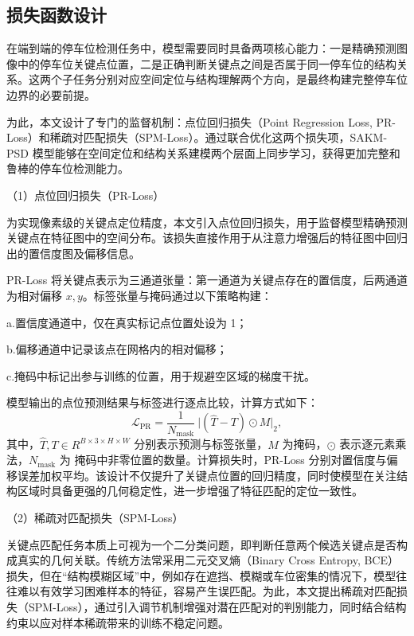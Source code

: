 \subsection{损失函数设计}
在端到端的停车位检测任务中，模型需要同时具备两项核心能力：一是精确预测图像中的停车位关键点位置，二是正确判断关键点之间是否属于同一停车位的结构关系。这两个子任务分别对应空间定位与结构理解两个方向，是最终构建完整停车位边界的必要前提。

为此，本文设计了专门的监督机制：点位回归损失（Point Regression Loss, PR-Loss）和稀疏对匹配损失（SPM-Loss）。通过联合优化这两个损失项，SAKM-PSD 模型能够在空间定位和结构关系建模两个层面上同步学习，获得更加完整和鲁棒的停车位检测能力。

（1）点位回归损失（PR-Loss）

为实现像素级的关键点定位精度，本文引入点位回归损失，用于监督模型精确预测关键点在特征图中的空间分布。该损失直接作用于从注意力增强后的特征图中回归出的置信度图及偏移信息。

PR-Loss 将关键点表示为三通道张量：第一通道为关键点存在的置信度，后两通道为相对偏移 $x, y$。标签张量与掩码通过以下策略构建：

a.置信度通道中，仅在真实标记点位置处设为 1；

b.偏移通道中记录该点在网格内的相对偏移；

c.掩码中标记出参与训练的位置，用于规避空区域的梯度干扰。


模型输出的点位预测结果与标签进行逐点比较，计算方式如下：
\begin{equation}
    \mathcal{L}_\mathrm{\mathrm{PR}}=\frac{1}{N_{\mathrm{mask}}}\left.\ |\left(\hat{T}-T\right)\odot M\right.|_2,
\end{equation}
其中，$\hat{T}, T\in R^{B\times3\times H\times W}$ 分别表示预测与标签张量，$M$ 为掩码，$\odot$ 表示逐元素乘法，$N_{\mathrm{mask}}$ 为 掩码中非零位置的数量。计算损失时，PR-Loss 分别对置信度与偏移误差加权平均。该设计不仅提升了关键点位置的回归精度，同时使模型在关注结构区域时具备更强的几何稳定性，进一步增强了特征匹配的定位一致性。

（2）稀疏对匹配损失（SPM-Loss）

关键点匹配任务本质上可视为一个二分类问题，即判断任意两个候选关键点是否构成真实的几何关联。传统方法常采用二元交叉熵（Binary Cross Entropy, BCE）损失，但在“结构模糊区域”中，例如存在遮挡、模糊或车位密集的情况下，模型往往难以有效学习困难样本的特征，容易产生误匹配。为此，本文提出稀疏对匹配损失（SPM-Loss），通过引入调节机制增强对潜在匹配对的判别能力，同时结合结构约束以应对样本稀疏带来的训练不稳定问题。

